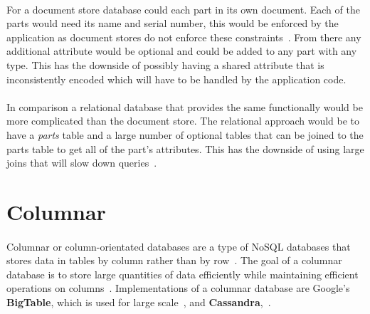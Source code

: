 \documentclass{CRPITStyle}
\renewcommand{\cite}{\citep}
\begin{document}
\paragraph{}
For a document store database could each part in its own document.
Each of the parts would need its name and serial number, this would
be enforced by the application as document stores do not enforce these
constraints~\cite{nosql_db,basex,nosql_survey}.
From there any additional attribute would be optional and could
be added to any part with any type.
This has the downside of possibly having a shared attribute that
is inconsistently encoded which will have to be handled by the application
code.

\paragraph{}
In comparison a relational database that provides the same functionally
would be more complicated than the document store.
The relational approach would be to have a \textit{parts} table
and a large number of optional tables that can be joined to the parts
table to get all of the part's attributes.
This has the downside of using large joins that will slow down
queries~\cite{scalable_sql}.




\section{Columnar}

\paragraph{}
Columnar or column-orientated databases are a type of NoSQL databases that
stores data in tables by column rather than by row~\cite{nosql_survey}.
The goal of a columnar database is to store large quantities of data efficiently
while maintaining efficient operations on columns~\cite{nosql_survey,nosql_eval}.
Implementations of a columnar database are Google's
\textbf{BigTable}, which is used for large scale~\cite{bigtable}, and
\textbf{Cassandra},~\cite{cassandra}.
\end{document}
